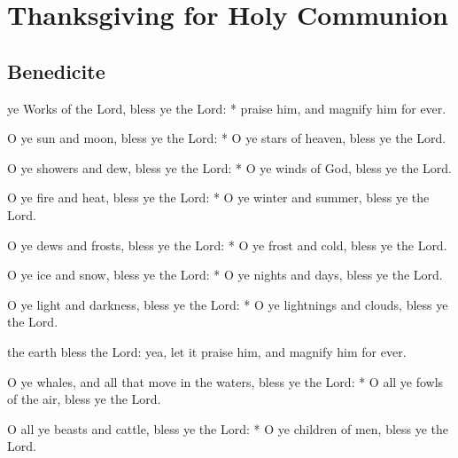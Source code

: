 \fancyhead[RE,LO]{}
\section{Thanksgiving for Holy Communion}\label{CommunionThanksgiving}%
\begin{multicols}{2}\par\noindent
{}

\subsection{Benedicite}

 ye Works of the Lord, bless ye the Lord: * praise him, and magnify him for ever.\par
{}

    O ye sun and moon, bless ye the Lord: * O ye stars of heaven, bless ye the Lord.
    
    O ye showers and dew, bless ye the Lord: * O ye winds of God, bless ye the Lord.
    
    O ye fire and heat, bless ye the Lord: * O ye winter and summer, bless ye the Lord.
    
    O ye dews and frosts, bless ye the Lord: * O ye frost and cold, bless ye the Lord.
    
    O ye ice and snow, bless ye the Lord: * O ye nights and days, bless ye the Lord.
    
    O ye light and darkness, bless ye the Lord: * O ye lightnings and clouds, bless ye the Lord.

{} the earth bless the Lord: yea, let it praise him, and magnify him for ever.\par
{}
    O ye whales, and all that move in the waters, bless ye the Lord: * O all ye fowls of the air, bless ye the Lord.
    
    O all ye beasts and cattle, bless ye the Lord: * O ye children of men, bless ye the Lord.
    

\end{multicols}
